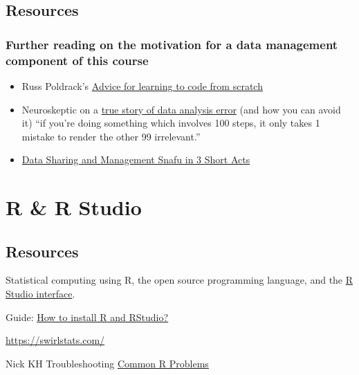\documentclass[
]{book}
\providecommand{\tightlist}{%
  \setlength{\itemsep}{0pt}\setlength{\parskip}{0pt}}
\begin{document}
\hypertarget{resources}{%
\section{Resources}\label{resources}}

\hypertarget{further-reading-on-the-motivation-for-a-data-management-component-of-this-course}{%
\subsection{Further reading on the motivation for a data management component of this course}\label{further-reading-on-the-motivation-for-a-data-management-component-of-this-course}}

\begin{itemize}
\tightlist
\item
  Russ Poldrack's \href{http://www.russpoldrack.org/2016/05/advice-for-learning-to-code-from-scratch.html}{Advice for learning to code from scratch}
\item
  Neuroskeptic on a \href{http://neuroskeptic.blogspot.com/2011/04/tufnel-effect.html}{true story of data analysis error} (and how you can avoid it) ``if you're doing something which involves 100 steps, it only takes 1 mistake to render the other 99 irrelevant.''
\item
  \href{https://www.youtube.com/watch?v=66oNv_DJuPc}{Data Sharing and Management Snafu in 3 Short Acts}
\end{itemize}

\hypertarget{r-r-studio}{%
\chapter{R \& R Studio}\label{r-r-studio}}

\hypertarget{resources-1}{%
\section{Resources}\label{resources-1}}

Statistical computing using R, the open source programming language, and the \href{https://rstudio.com/}{R Studio interface}.

Guide: \href{https://www.r-bloggers.com/2019/12/how-to-install-r-and-rstudio-2/}{How to install R and RStudio?}

\href{https://swirlstats.com/students.html}{https://swirlstats.com/}

Nick KH Troubleshooting \href{https://nickch-k.github.io/DataCommSlides/Lecture_04_Common_R_Problems.html}{Common R Problems}
\end{document}
